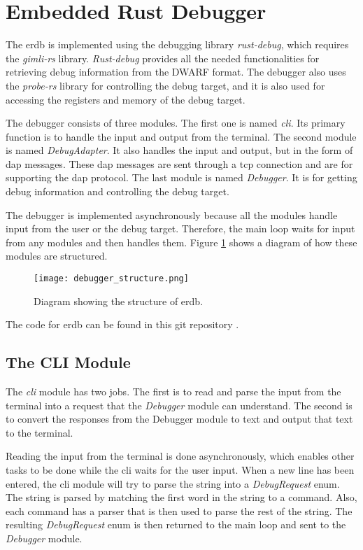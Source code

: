 \section{Embedded Rust Debugger}
The \acrfull{erdb} is implemented using the debugging library \emph{rust-debug}, which requires the \emph{gimli-rs} library.
\emph{Rust-debug} provides all the needed functionalities for retrieving debug information from the \gls{DWARF} format.
The debugger also uses the \emph{probe-rs} library for controlling the debug target, and it is also used for accessing the registers and memory of the debug target.


The debugger consists of three modules.
The first one is named \emph{\acrshort{cli}}.
Its primary function is to handle the input and output from the terminal.
The second module is named \emph{DebugAdapter}.
It also handles the input and output, but in the form of \gls{dap} messages.
These \gls{dap} messages are sent through a \acrshort{tcp} connection and are for supporting the \gls{dap} protocol.
The last module is named \emph{Debugger}.
It is for getting debug information and controlling the debug target.


The debugger is implemented asynchronously because all the modules handle input from the user or the debug target.
Therefore, the main loop waits for input from any modules and then handles them.
Figure \ref{fig:ERDStruct} shows a diagram of how these modules are structured.


\begin{figure}[h]
	\centering
	\texttt{[image: debugger\_structure.png]}
	\caption{Diagram showing the structure of \gls{erdb}.}
	\label{fig:ERDStruct}
\end{figure}


The code for \gls{erdb} can be found in this git repository \cite{erdb}.


\subsection{The CLI Module} 
The \emph{\acrshort{cli}} module has two jobs.
The first is to read and parse the input from the terminal into a request that the \emph{Debugger} module can understand.
The second is to convert the responses from the Debugger module to text and output that text to the terminal.


Reading the input from the terminal is done asynchronously, which enables other tasks to be done while the \acrshort{cli} waits for the user input.
When a new line has been entered, the \acrshort{cli} module will try to parse the string into a \emph{DebugRequest} enum.
The string is parsed by matching the first word in the string to a command.
Also, each command has a parser that is then used to parse the rest of the string.
The resulting \emph{DebugRequest} enum is then returned to the main loop and sent to the \emph{Debugger} module.


